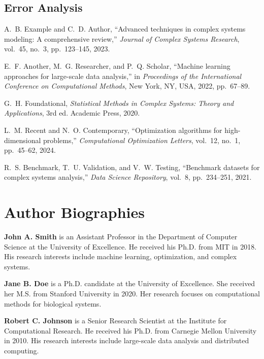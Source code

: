 \documentclass[12pt, letterpaper, onecolumn, final]{article}
\theoremstyle{plain}
\theoremstyle{definition}
\theoremstyle{remark}
\begin{document}
\lipsum[64]

\subsection{Error Analysis}
\label{app:errors}

\lipsum[65-66]

%

\begin{thebibliography}{99}

A.~B. Example and C.~D. Author, ``Advanced techniques in complex systems modeling: A comprehensive review,'' \textit{Journal of Complex Systems Research}, vol.~45, no.~3, pp.~123--145, 2023.

E.~F. Another, M.~G. Researcher, and P.~Q. Scholar, ``Machine learning approaches for large-scale data analysis,'' in \textit{Proceedings of the International Conference on Computational Methods}, New York, NY, USA, 2022, pp.~67--89.

G.~H. Foundational, \textit{Statistical Methods in Complex Systems: Theory and Applications}, 3rd ed. Academic Press, 2020.

L.~M. Recent and N.~O. Contemporary, ``Optimization algorithms for high-dimensional problems,'' \textit{Computational Optimization Letters}, vol.~12, no.~1, pp.~45--62, 2024.

R.~S. Benchmark, T.~U. Validation, and V.~W. Testing, ``Benchmark datasets for complex systems analysis,'' \textit{Data Science Repository}, vol.~8, pp.~234--251, 2021.

\end{thebibliography}

\section*{Author Biographies}

\textbf{John A. Smith} is an Assistant Professor in the Department of Computer Science at the University of Excellence. He received his Ph.D. from MIT in 2018. His research interests include machine learning, optimization, and complex systems.

\textbf{Jane B. Doe} is a Ph.D. candidate at the University of Excellence. She received her M.S. from Stanford University in 2020. Her research focuses on computational methods for biological systems.

\textbf{Robert C. Johnson} is a Senior Research Scientist at the Institute for Computational Research. He received his Ph.D. from Carnegie Mellon University in 2010. His research interests include large-scale data analysis and distributed computing.
\end{document}
